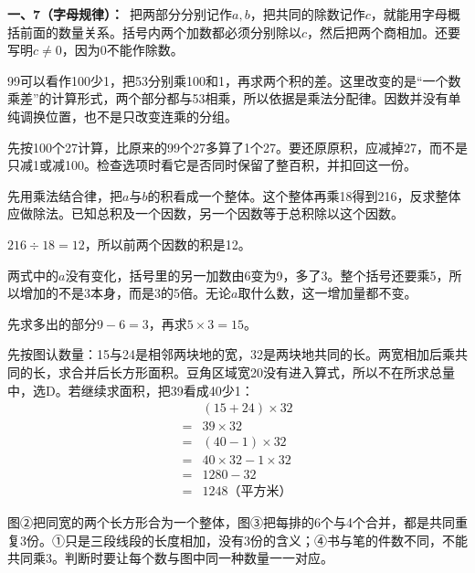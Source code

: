 \documentclass[multi=snippet,border=0pt]{standalone}
\newenvironment{snippet}[3]{\begin{minipage}{#1bp}\color{answerred}\fontsize{#2}{#3}\selectfont\raggedright}{\end{minipage}}
\begin{document}
\begin{snippet}{505}{11.5}{14}\textbf{一、7（字母规律）：}\ 把两部分分别记作\(a,b\)，把共同的除数记作\(c\)，就能用字母概括前面的数量关系。括号内两个加数都必须分别除以\(c\)，然后把两个商相加。还要写明\(c\ne0\)，因为0不能作除数。\end{snippet}
\begin{snippet}{505}{11.5}{14}99可以看作100少1，把53分别乘100和1，再求两个积的差。这里改变的是“一个数乘差”的计算形式，两个部分都与53相乘，所以依据是乘法分配律。因数并没有单纯调换位置，也不是只改变连乘的分组。\end{snippet}
\begin{snippet}{505}{11.5}{14}先按100个27计算，比原来的99个27多算了1个27。要还原原积，应减掉27，而不是只减1或减100。检查选项时看它是否同时保留了整百积，并扣回这一份。\end{snippet}
\begin{snippet}{505}{11.5}{14}先用乘法结合律，把\(a\)与\(b\)的积看成一个整体。这个整体再乘18得到216，反求整体应做除法。已知总积及一个因数，另一个因数等于总积除以这个因数。\par \(216\div18=12\)，所以前两个因数的积是12。\end{snippet}
\begin{snippet}{505}{11.5}{14}两式中的\(a\)没有变化，括号里的另一加数由6变为9，多了3。整个括号还要乘5，所以增加的不是3本身，而是3的5倍。无论\(a\)取什么数，这一增加量都不变。\par 先求多出的部分\(9-6=3\)，再求\(5\times3=15\)。\end{snippet}
\begin{snippet}{505}{11.5}{14}先按图认数量：15与24是相邻两块地的宽，32是两块地共同的长。两宽相加后乘共同的长，求合并后长方形面积。豆角区域宽20没有进入算式，所以不在所求总量中，选D。若继续求面积，把39看成40少1：\[\begin{aligned}&(15+24)\times32\\={}&39\times32\\={}&(40-1)\times32\\={}&40\times32-1\times32\\={}&1280-32\\={}&1248\text{（平方米）}\end{aligned}\]\end{snippet}
\begin{snippet}{505}{11.5}{14}图②把同宽的两个长方形合为一个整体，图③把每排的6个与4个合并，都是共同重复3份。①只是三段线段的长度相加，没有3份的含义；④书与笔的件数不同，不能共同乘3。判断时要让每个数与图中同一种数量一一对应。\end{snippet}
\end{document}
